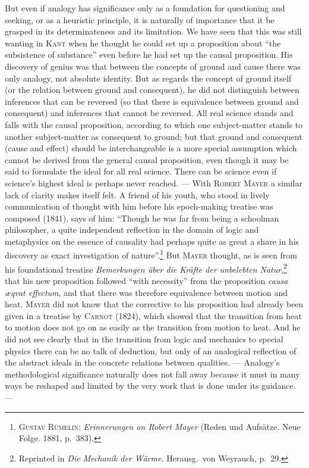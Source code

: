 \documentclass[12pt]{book}
\newcommand{\opage}[1]{\marginnote{\footnotesize\textit{[#1]}}}
\begin{document}
But even if analogy has significance only as a foundation for questioning and
seeking, or as a heuristic principle, it is naturally of importance that it be
grasped in its determinateness and its limitation. We have seen that this was
still wanting in \textsc{Kant} when he thought he could set up a proposition about
``the subsistence of substance'' even before he had set up the causal proposition.
His discovery of genius was that between the concepts of ground and cause there
was only analogy, not absolute identity. But as regards the concept of ground
itself (or the relation between ground and consequent), he did not distinguish
between inferences that can be reversed (so that there is equivalence between
ground and consequent) and inferences that cannot be reversed. All real science
stands and falls with the causal proposition, according to which one
subject-matter stands to another subject-matter as consequent to ground; but that
ground and consequent (cause and effect) should be interchangeable is a more
special assumption which cannot be derived from the general causal proposition,
even though it may be said to formulate the ideal for all real science. There can
be science even if science's highest ideal is perhaps never reached. --- With
\textsc{Robert Mayer} a similar lack of clarity makes itself felt. A friend of his
youth, who stood in lively communication of thought with him before his
epoch-making treatise was composed (1841), says of him: ``Though he was far from
being a schoolman philosopher, a quite independent reflection in the domain of
logic and metaphysics on the essence of causality had perhaps quite as great a
share in his discovery as exact investigation of nature''.\footnote{\textsc{Gustav
Rümelin:} \textit{Erinnerungen an Robert Mayer} (Reden und Aufsätze. Neue Folge.
1881, p.\ 383).} But \textsc{Mayer} thought, \opage{102}as is seen from his foundational
treatise \textit{Bemerkungen über die Kräfte der unbelebten
Natur},\footnote{Reprinted in \textit{Die Mechanik der Wärme.} Herausg.\ von
Weyrauch, p.\ 29.} that his new proposition followed ``with necessity'' from the
proposition \textit{causa æqvat effectum}, and that there was therefore
equivalence between motion and heat. \textsc{Mayer} did not know that the
corrective to his proposition had already been given in a treatise by
\textsc{Carnot} (1824), which showed that the transition from heat to motion does
not go on as easily as the transition from motion to heat. And he did not see
clearly that in the transition from logic and mechanics to special physics there
can be no talk of deduction, but only of an analogical reflection of the abstract
ideals in the concrete relations between qualities. --- Analogy's methodological
significance naturally does not fall away because it must in many ways be
reshaped and limited by the very work that is done under its guidance. ---
\end{document}
